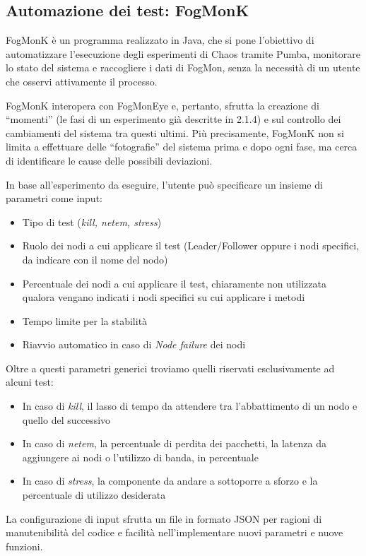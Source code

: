         \subsection{Automazione dei test: FogMonK}
        \label{subsec:FogMonK}
        FogMonK è un programma realizzato in Java, che si pone l’obiettivo di automatizzare l'esecuzione degli esperimenti di Chaos tramite Pumba, monitorare lo stato del sistema e raccogliere i dati di FogMon, senza la necessità di un utente che osservi attivamente il processo.
        
        FogMonK interopera con FogMonEye e, pertanto, sfrutta la creazione di “momenti” (le fasi di un esperimento già descritte in 2.1.4) e sul controllo dei cambiamenti del sistema tra questi ultimi. Più precisamente, FogMonK non si limita a effettuare delle “fotografie” del sistema prima e dopo ogni fase, ma cerca di identificare le cause delle possibili deviazioni.
        
        In base all'esperimento da eseguire, l'utente può specificare un insieme di parametri come input: 
        \begin{itemize}
            \item Tipo di test (\textit{kill, netem, stress}) 
            
            \item Ruolo dei nodi a cui applicare il test (Leader/Follower oppure i nodi specifici, da indicare con il nome del nodo) 
            
            \item Percentuale dei nodi a cui applicare il test, chiaramente non utilizzata qualora vengano indicati i nodi specifici su cui applicare i metodi 
            
            \item Tempo limite per la stabilità 
            
            \item Riavvio automatico in caso di \textit{Node failure} dei nodi 
        \end{itemize}
        Oltre a questi parametri generici troviamo quelli riservati esclusivamente ad alcuni test: 
        \begin{itemize}
            \item In caso di \textit{kill}, il lasso di tempo da attendere tra l’abbattimento di un nodo e quello del successivo 
            
            \item In caso di \textit{netem}, la percentuale di perdita dei pacchetti, la latenza da aggiungere ai nodi o l’utilizzo di banda, in percentuale 
            
            \item In caso di \textit{stress}, la componente da andare a sottoporre a sforzo e la percentuale di utilizzo desiderata 
        \end{itemize}
        La configurazione di input sfrutta un file in formato JSON per ragioni di manutenibilità del codice e facilità nell’implementare nuovi parametri e nuove funzioni.
        
